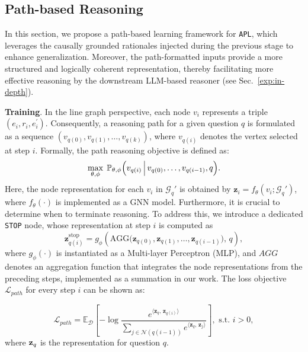 \documentclass{article}
\theoremstyle{plain}
\theoremstyle{definition}
\theoremstyle{remark}
\newcommand{\tb}[1]{\textbf{#1}}
\newcommand{\mcal}[1]{\mathcal{#1}}
\newcommand{\proj}{\texttt{\scalebox{1.03}{R}APL}}
\begin{document}
\subsection{Path-based Reasoning}
In this section, we propose a path-based learning framework for \proj, which leverages the causally grounded rationales injected during the previous stage to enhance generalization. Moreover, the path-formatted inputs provide a more structured and logically coherent representation, thereby facilitating more effective reasoning by the downstream LLM-based reasoner (see Sec.~\ref{exp:in-depth}).
 
\tb{Training}. In the line graph perspective, each node $v_i$ represents a triple $(e_i, r_i, e_{i}^\prime)$. Consequently, a reasoning path for a given question $q$ is formulated as a sequence $(v_{q(0)}, v_{q(1)}, \ldots, v_{q(k)})$, where $v_{q(i)}$ denotes the vertex selected at step $i$.
Formally, the path reasoning objective is defined as:
\begin{equation}
\max_{\theta,\phi} \; \mathbb{P}_{\theta,\phi}\Bigl( v_{q(i)} \,\Big|\, v_{q(0)}, \ldots, v_{q(i-1)}, q \Bigr).
\end{equation}
Here, the node representation for each $v_i$ in $\mcal{G}_q'$ is obtained by $\mathbf{z}_i = f_\theta(v_i; \mcal{G}_q')$,
where $f_\theta(\cdot)$ is implemented as a GNN model. Furthermore, it is crucial to determine when to terminate reasoning. To address this, we introduce a dedicated \texttt{STOP} node, whose representation at step $i$ is computed as
\begin{equation}
\mathbf{z}^{\text{stop}}_{q(i)} = g_{\phi}( \text{AGG}\bigl(\mathbf{z}_{q(0)}, \mathbf{z}_{q(1)}, \ldots, \mathbf{z}_{q(i-1)}\bigr), \, q ),
\end{equation}
where $g_{\phi}(\cdot)$ is instantiated as a Multi-layer Perceptron (MLP), and $AGG$ denotes an aggregation function that integrates the node representations from the preceding steps, implemented as a summation in our work. The loss objective $\mcal{L}_{path}$ for every step $i$ can be shown as:

\begin{equation}
\label{path_loss}
\mcal{L}_{path} = \mathbb{E}_{\mcal{D}} \left[ -\log \frac{e^{\langle \mathbf{z}_q,\, \mathbf{z}_{q(i)}\rangle}}{\sum_{j \in \mcal{N}(q(i-1))} e^{\langle \mathbf{z}_q,\, \mathbf{z}_j\rangle}} \right], \text{ s.t. } i>0,
\end{equation}
where ${\mathbf{z}}_q$ is the representation for question $q$. 
\end{document}
